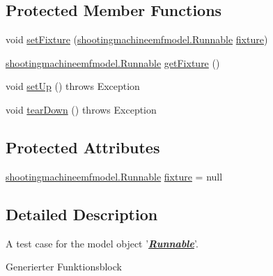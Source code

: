 \subsection*{Protected Member Functions}
\begin{DoxyCompactItemize}
\item 
void \hyperlink{classshootingmachineemfmodel_1_1tests_1_1_runnable_test_a7648c0ab922d93201d07abe494dbfd19}{set\-Fixture} (\hyperlink{interfaceshootingmachineemfmodel_1_1_runnable}{shootingmachineemfmodel.\-Runnable} \hyperlink{classshootingmachineemfmodel_1_1tests_1_1_runnable_test_a98d9a54395c948b2684a42eed1c01a4b}{fixture})
\item 
\hyperlink{interfaceshootingmachineemfmodel_1_1_runnable}{shootingmachineemfmodel.\-Runnable} \hyperlink{classshootingmachineemfmodel_1_1tests_1_1_runnable_test_a8fccc760c37332a1b856e67316e70b4e}{get\-Fixture} ()
\item 
void \hyperlink{classshootingmachineemfmodel_1_1tests_1_1_runnable_test_af94d6f91aa40643eb65800db4b67e986}{set\-Up} ()  throws Exception 
\item 
void \hyperlink{classshootingmachineemfmodel_1_1tests_1_1_runnable_test_a712ffffb50112a7ff4be59269a1c5ea9}{tear\-Down} ()  throws Exception 
\end{DoxyCompactItemize}
\subsection*{Protected Attributes}
\begin{DoxyCompactItemize}
\item 
\hyperlink{interfaceshootingmachineemfmodel_1_1_runnable}{shootingmachineemfmodel.\-Runnable} \hyperlink{classshootingmachineemfmodel_1_1tests_1_1_runnable_test_a98d9a54395c948b2684a42eed1c01a4b}{fixture} = null
\end{DoxyCompactItemize}


\subsection{Detailed Description}
A test case for the model object '{\itshape {\bfseries \hyperlink{interfaceshootingmachineemfmodel_1_1_runnable}{Runnable}}}'.

Generierter Funktionsblock 


